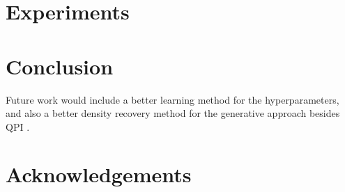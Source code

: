 \documentclass[twoside]{article} \usepackage{aistats2017}
\theoremstyle{definition}
\theoremstyle{remark}
\newcommand{\warn}[1]{{\color{RedOrange} #1}}
\newcommand{\qpi}{QPI }
\begin{document}
\section{Experiments}
\label{sec:experiments}

\section{Conclusion}
\label{sec:conclusion}

	\warn{Future work would include a better learning method for the hyperparameters, and also a better density recovery method for the generative approach besides \qpi.}
	

\section*{Acknowledgements}



\end{document}
